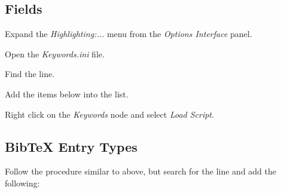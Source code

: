 \subsection{Fields}
\begin{numberedlist}
	\item Expand the \textit{Highlighting:...} menu from the \textit{Options Interface} panel.
	\item Open the \textit{Keywords.ini} file.
	\item Find the  line.
	\item Add the items below into the list.
	\item Right click on the \textit{Keywords} node and select \textit{Load Script}.
\end{numberedlist}
\begin{plainlist}
	\item {}
	\item {}
	\item {}
	\item {}
	\item {}
	\item {}
	\item {}
	\item {}
	\item {}
	\item {}
	\item {}
	\item {}
	\item {}
	\item {}
	\item {}
	\item {}
\end{plainlist}

\subsection{BibTeX Entry Types}
Follow the procedure similar to above, but search for the  line and add the following:
\begin{plainlist}
	\item {}
\end{plainlist}

